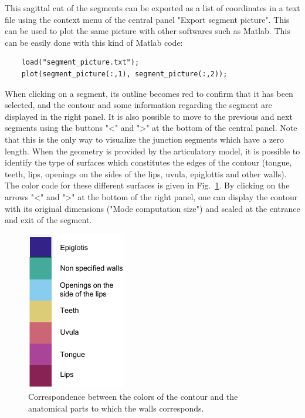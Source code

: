 \documentclass[]{article}
\begin{document}
	This sagittal cut of the segments can be exported as a list of 
	coordinates in a text file using the context menu of the central 
	panel "Export segment picture".
	This can be used to plot the same picture with other softwares such 
	as Matlab. This can be easily done with this kind of Matlab code:
	\begin{lstlisting}
	load("segment_picture.txt");
	plot(segment_picture(:,1), segment_picture(:,2));
	\end{lstlisting}
	
	When clicking on a segment, its outline becomes red to confirm that
	it has been selected, and the contour and some information 
	regarding the segment are displayed in the right panel.
	It is also possible to move to the previous and next segments using the buttons
	"<" and ">" at the bottom of the central panel.
	Note that this is the only way to visualize the junction segments which have 
	a zero length.
	When the geometry is provided by the articulatory model, it is 
	possible to identify the type of surfaces which constitutes the 
	edges of the contour (tongue, teeth, lips, openings on the sides of the 
	lips, uvula, epiglottis and other walls).
	The color code for these different surfaces is given in 
	Fig.~\ref{figure:colormap_anatomical_parts}.
	By clicking on the arrows "<" and ">" at the bottom of the right  
	panel, one can display the contour with its original dimensions 
	("Mode computation size") and scaled at the entrance and exit of the
	segment.
	
	\begin{figure}[h!]
		\centering
		\includegraphics{colormap_anatomical_parts.pdf}
		\caption{Correspondence between the colors of the contour and the 
			anatomical parts to which the walls corresponds.}
		\label{figure:colormap_anatomical_parts}
	\end{figure}
	
\end{document}
